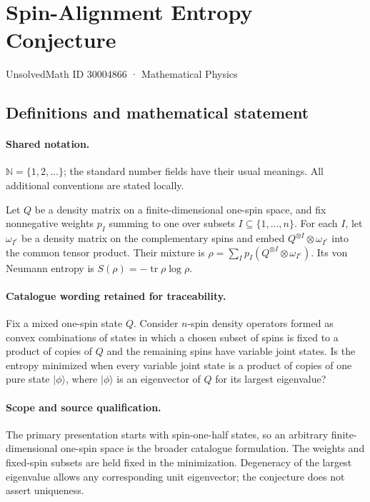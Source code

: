 \documentclass[11pt]{article}
\begin{document}
\setcounter{section}{30004865}
\section{Spin-Alignment Entropy Conjecture}\label{30004866}
{\small UnsolvedMath ID 30004866 · Mathematical Physics}
\subsection{Definitions and mathematical statement}

\paragraph{Shared notation.}$\mathbb N=\{1,2,\ldots\}$; the standard number fields have their usual meanings. All additional conventions are stated locally.


Let $Q$ be a density matrix on a finite-dimensional one-spin space, and fix nonnegative weights $p_I$ summing to one over subsets $I\subseteq\{1,\ldots,n\}$. For each $I$, let $\omega_{I^c}$ be a density matrix on the complementary spins and embed $Q^{\otimes I}\otimes\omega_{I^c}$ into the common tensor product. Their mixture is $\rho=\sum_Ip_I(Q^{\otimes I}\otimes\omega_{I^c})$. Its von Neumann entropy is $S(\rho)=-\operatorname{tr}\rho\log\rho$.

\paragraph{Catalogue wording retained for traceability.}
Fix a mixed one-spin state $Q$. Consider $n$-spin density operators formed as convex combinations of states in which a chosen subset of spins is fixed to a product of copies of $Q$ and the remaining spins have variable joint states. Is the entropy minimized when every variable joint state is a product of copies of one pure state $|\phi\rangle$, where $|\phi\rangle$ is an eigenvector of $Q$ for its largest eigenvalue?

\paragraph{Scope and source qualification.}The primary presentation starts with spin-one-half states, so an arbitrary finite-dimensional one-spin space is the broader catalogue formulation. The weights and fixed-spin subsets are held fixed in the minimization. Degeneracy of the largest eigenvalue allows any corresponding unit eigenvector; the conjecture does not assert uniqueness.
\end{document}
